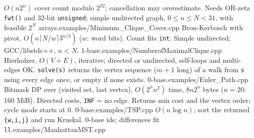 %
{$O(n2^n)$ cover count modulo $2^{32}$; cancellation may overestimate. Needs OR-zeta \texttt{fwt()} and 32-bit \texttt{unsigned}; simple undirected graph, $0\le n\le N<31$, with feasible $2^N$ arrays.}{examples/Minimum_Clique_Cover.cpp}
%
{Bron-Kerbosch with pivot, $O(n\lceil N/w\rceil3^{n/3})$ ($w$: word bits). Count fits \texttt{int}. Simple undirected; GCC/libstdc++, $n<N$. 1-base.}{examples/NumberofMaximalClique.cpp}
%
{Hierholzer, $O(V+E)$, iterative; directed or undirected, self-loops and multi-edges OK. \texttt{solve(s)} returns the vertex sequence ($m+1$ long) of a walk from \texttt{s} using every edge once, or empty if none exists. 0-base.}{examples/Euler_Path.cpp}
%
{Bitmask DP over (visited set, last vertex), $O(2^nn^2)$ time, $8n2^n$ bytes ($n=20$: 160 MiB). Directed costs, \texttt{INF} = no edge. Returns min cost and the vertex order; cycle mode starts at 0. 0-base.}{examples/TSP.cpp}
%
{$O(n\log n)$; sort the returned \texttt{\{w,i,j\}} and run Kruskal. 0-base ids; differences fit \texttt{ll}.}{examples/ManhattanMST.cpp}


